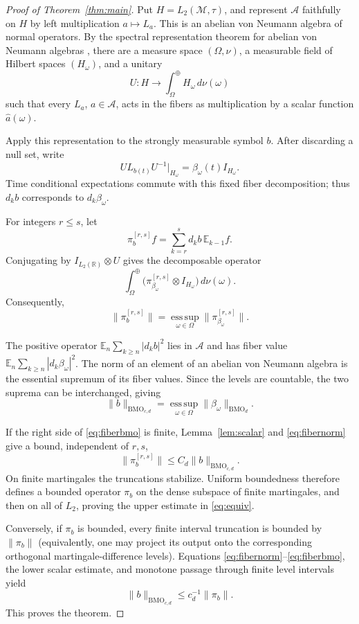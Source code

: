 \documentclass[11pt]{article}
\newcommand{\M}{\mathcal M}
\newcommand{\A}{\mathcal A}
\newcommand{\E}{\mathbb E}
\newcommand{\BMO}{\mathrm{BMO}}
\begin{document}
\begin{proof}[Proof of Theorem~\ref{thm:main}]
Put $H=L_2(\M,\tau)$, and represent $\A$ faithfully on $H$ by left
multiplication $a\mapsto L_a$.  This is an abelian von Neumann algebra of
normal operators.  By the spectral representation theorem for abelian von
Neumann algebras \cite[Ch.~9]{KadisonRingrose}, there are a measure space
$(\Omega,\nu)$, a measurable field of Hilbert spaces $(H_\omega)$, and a
unitary
\[
 U:H\longrightarrow\int_\Omega^\oplus H_\omega\,d\nu(\omega)
\]
such that every $L_a$, $a\in\A$, acts in the fibers as multiplication by a
scalar function $\widehat a(\omega)$.

Apply this representation to the strongly measurable symbol $b$.  After
discarding a null set, write
\[
 U L_{b(t)}U^{-1}\big|_{H_\omega}
   =\beta_\omega(t) I_{H_\omega}.
\]
Time conditional expectations commute with this fixed fiber decomposition;
thus $d_kb$ corresponds to $d_k\beta_\omega$.

For integers $r\le s$, let
\[
 \pi_b^{[r,s]}f=\sum_{k=r}^s d_kb\,\E_{k-1}f.
\]
Conjugating by $I_{L_2(\mathbb R)}\otimes U$ gives the decomposable operator
\[
 \int_\Omega^\oplus
   \bigl(\pi_{\beta_\omega}^{[r,s]}\otimes I_{H_\omega}\bigr)
 \,d\nu(\omega).
\]
Consequently,
\begin{equation}\label{eq:fibernorm}
 \|\pi_b^{[r,s]}\|
 =\operatorname*{ess\,sup}_{\omega\in\Omega}
   \|\pi_{\beta_\omega}^{[r,s]}\|.
\end{equation}

The positive operator
$\E_n\sum_{k\ge n}|d_kb|^2$ lies in $\A$ and has fiber value
$\E_n\sum_{k\ge n}|d_k\beta_\omega|^2$.  The norm of an element of an
abelian von Neumann algebra is the essential supremum of its fiber values.
Since the levels are countable, the two suprema can be interchanged, giving
\begin{equation}\label{eq:fiberbmo}
 \|b\|_{\BMO_{c,d}}
 =\operatorname*{ess\,sup}_{\omega\in\Omega}
   \|\beta_\omega\|_{\BMO_d}.
\end{equation}

If the right side of \eqref{eq:fiberbmo} is finite, Lemma~\ref{lem:scalar}
and \eqref{eq:fibernorm} give a bound, independent of $r,s$,
\[
 \|\pi_b^{[r,s]}\|\le C_d\|b\|_{\BMO_{c,d}}.
\]
On finite martingales the truncations stabilize.  Uniform boundedness
therefore defines a bounded operator $\pi_b$ on the dense subspace of finite
martingales, and then on all of $L_2$, proving the upper estimate in
\eqref{eq:equiv}.

Conversely, if $\pi_b$ is bounded, every finite interval truncation is bounded
by $\|\pi_b\|$ (equivalently, one may project its output onto the corresponding
orthogonal martingale-difference levels).  Equations
\eqref{eq:fibernorm}--\eqref{eq:fiberbmo}, the lower scalar estimate, and
monotone passage through finite level intervals yield
\[
 \|b\|_{\BMO_{c,d}}\le c_d^{-1}\|\pi_b\|.
\]
This proves the theorem.
\end{proof}
\end{document}
